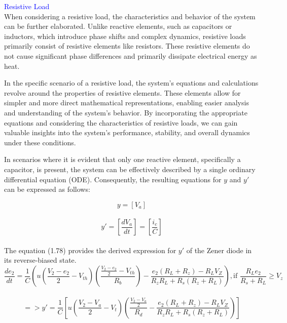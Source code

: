 \textcolor{blue}{Resistive Load}\\

When considering a resistive load, the characteristics and behavior of the system can be further elaborated. Unlike reactive elements, such as capacitors or inductors, which introduce phase shifts and complex dynamics, resistive loads primarily consist of resistive elements like resistors. These resistive elements do not cause significant phase differences and primarily dissipate electrical energy as heat.

In the specific scenario of a resistive load, the system's equations and calculations revolve around the properties of resistive elements. These elements allow for simpler and more direct mathematical representations, enabling easier analysis and understanding of the system's behavior. By incorporating the appropriate equations and considering the characteristics of resistive loads, we can gain valuable insights into the system's performance, stability, and overall dynamics under these conditions.

In scenarios where it is evident that only one reactive element, specifically a capacitor, is present, the system can be effectively described by a single ordinary differential equation (ODE). Consequently, the resulting equations for $y$ and $y'$ can be expressed as follows:

\begin{equation}
    y=[V_a]
\end{equation}\\

\begin{equation}
    y'=[\frac{dV_a}{dt}]=[\frac{i_c}{C}]
\end{equation}\\

The equation (1.78) provides the derived expression for $y'$ of the Zener diode in its reverse-biased state.\\

\begin{equation}
    \frac{de_2}{dt}=\frac{1}{C}\left(u\left(\frac{V_2-e_2}{2}-V_{th}\right)\left(\frac{\frac{V_2-e_2}{2}-V_{th}}{R_b}\right)-\frac{e_2(R_L+R_z)-R_LV_Z}{R_zR_L+R_s(R_z+R_L)}\right), \text{if } \frac{R_Le_2}{R_s+R_L} \geq V_z
\end{equation}\\

\begin{equation}
    =>y'=\frac{1}{C}[u(\frac{V_2-V_a}{2}-V_t)(\frac{\frac{V_2-V_a}{2}}{R_d}-\frac{e_2(R_L+R_z)-R_LV_Z}{R_zR_L+R_s(R_z+R_L)})]
\end{equation}

